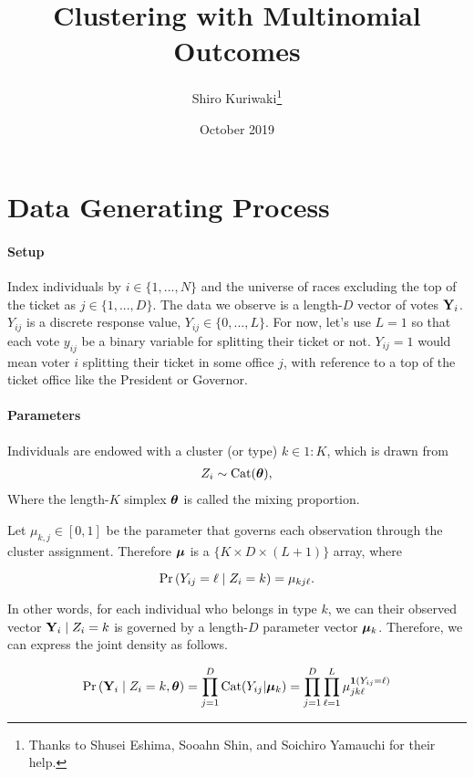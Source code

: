\documentclass[11pt]{article}
\title{ \Large\textbf{Clustering with Multinomial Outcomes}}
\author{\normalsize  Shiro Kuriwaki\thanks{Thanks to Shusei Eshima, Sooahn Shin, and Soichiro Yamauchi for their help.} }
\date{\normalsize October 2019}
\begin{document}
\maketitle

\onehalfspacing


\section{Data Generating Process}


\paragraph{Setup}

Index individuals by \(i \in \{1, ..., N\}\) and the universe of races
excluding the top of the ticket as \(j \in \{1, ..., D\}\). The data we
observe is a length-\(D\) vector of votes \(\mathbf{Y}_i\). \(Y_{ij}\) is a
discrete response value, \(Y_{ij} \in \{0, ..., L\}\). For now, let's use \(L = 1\) so that each vote \(y_{ij}\) be a binary variable for splitting their ticket or not. \(Y_{ij} = 1\) would mean voter \(i\) splitting their ticket in some office \(j\), with reference to a top of the ticket office like the President or Governor.


\paragraph{Parameters}


Individuals are endowed with a cluster (or type) \(k \in 1:K\), which is drawn from 
\begin{align*}
Z_i \sim  \text{Cat}(\bm{\theta}),
\end{align*}
Where the length-\(K\) simplex \(\bm{\theta}\) is called the mixing proportion.

Let \(\mu_{k, j} \in [0, 1]\) be the parameter that governs each observation through the cluster assignment. Therefore \(\bm{\mu}\) is a \(\{K \times D \times (L + 1)\}\) array, where 

 \[\mathbb{\Pr}\left(Y_{ij} = \ell \mid Z_i = k\right) = \mu_{kj\ell}.\]

In other words, for each individual who belongs in type \(k\), we can their observed vector \(\mathbf{Y}_{i} \mid Z_i = k\) is governed by a length-\(D\) parameter vector \(\bm{\mu}_{k}\). Therefore, we can express the joint density as follows. 

\begin{align}
\mathbb{\Pr}\left(\mathbf{Y}_{i} \mid Z_{i} = k, \bm{\theta}\right) = \prod^{D}_{j = 1} \text{Cat}(Y_{ij} | \bm{\mu}_k) = \prod^{D}_{j = 1}\prod^{L}_{\ell=1} \mu_{jk\ell}^{\bm{1}\left(Y_{ij} = \ell\right)}
\end{align}
\end{document}
